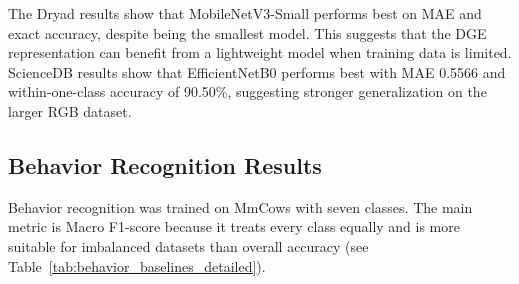 \begin{table}[H]
\centering
\caption{BCS baseline results on Dryad and ScienceDB.}
\label{tab:bcs_baselines_detailed}
\end{table}

The Dryad results show that MobileNetV3-Small performs best on MAE and exact accuracy, despite being the smallest model. This suggests that the DGE representation can benefit from a lightweight model when training data is limited. ScienceDB results show that EfficientNetB0 performs best with MAE 0.5566 and within-one-class accuracy of 90.50\%, suggesting stronger generalization on the larger RGB dataset.

\subsection{Behavior Recognition Results}
Behavior recognition was trained on MmCows with seven classes. The main metric is Macro F1-score because it treats every class equally and is more suitable for imbalanced datasets than overall accuracy (see Table~\ref{tab:behavior_baselines_detailed}).

\begin{table}[H]
\centering
\caption{Behavior recognition baseline results on MmCows.}
\label{tab:behavior_baselines_detailed}
\end{table}

